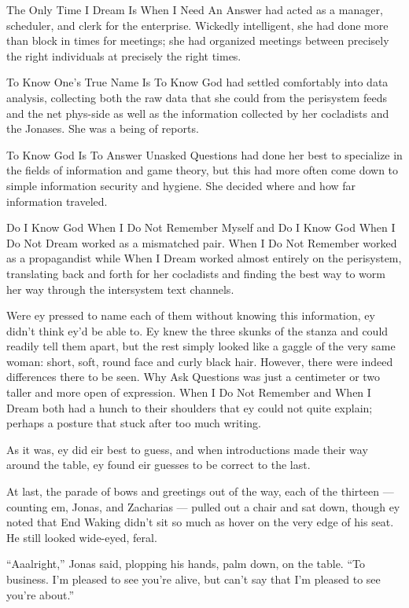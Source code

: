 The Only Time I Dream Is When I Need An Answer had acted as a manager, scheduler, and clerk for the enterprise. Wickedly intelligent, she had done more than block in times for meetings; she had organized meetings between precisely the right individuals at precisely the right times.

To Know One's True Name Is To Know God had settled comfortably into data analysis, collecting both the raw data that she could from the perisystem feeds and the net phys-side as well as the information collected by her cocladists and the Jonases. She was a being of reports.

To Know God Is To Answer Unasked Questions had done her best to specialize in the fields of information and game theory, but this had more often come down to simple information security and hygiene. She decided where and how far information traveled.

Do I Know God When I Do Not Remember Myself and Do I Know God When I Do Not Dream worked as a mismatched pair. When I Do Not Remember worked as a propagandist while When I Dream worked almost entirely on the perisystem, translating back and forth for her cocladists and finding the best way to worm her way through the intersystem text channels.

Were ey pressed to name each of them without knowing this information, ey didn't think ey'd be able to. Ey knew the three skunks of the stanza and could readily tell them apart, but the rest simply looked like a gaggle of the very same woman: short, soft, round face and curly black hair. However, there were indeed differences there to be seen. Why Ask Questions was just a centimeter or two taller and more open of expression. When I Do Not Remember and When I Dream both had a hunch to their shoulders that ey could not quite explain; perhaps a posture that stuck after too much writing.

As it was, ey did eir best to guess, and when introductions made their way around the table, ey found eir guesses to be correct to the last.

At last, the parade of bows and greetings out of the way, each of the thirteen — counting em, Jonas, and Zacharias — pulled out a chair and sat down, though ey noted that End Waking didn't sit so much as hover on the very edge of his seat. He still looked wide-eyed, feral.

``Aaalright,'' Jonas said, plopping his hands, palm down, on the table. ``To business. I'm pleased to see you're alive, but can't say that I'm pleased to see you're about.''

